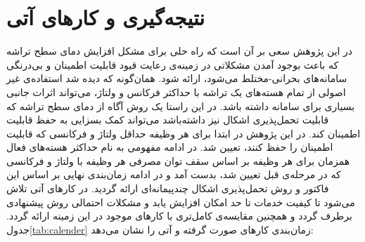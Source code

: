  \section{نتیجه‌گیری و کارهای آتی}
\label{sec:conclusion}
در این پژوهش سعی بر آن است که راه حلی برای مشکل افزایش دمای سطح تراشه که باعث بوجود آمدن مشکلاتی در زمینه‌ی رعایت قیود قابلیت اطمینان و بی‌درنگی سامانه‌های بحرانی-مختلط می‌شود، ارائه شود. همان‌گونه که دیده شد استفاده‌ی غیر اصولی از تمام هسته‌های یک تراشه با حداکثر فرکانس و ولتاژ، می‌تواند اثرات جانبی بسیاری برای سامانه داشته باشد. در این راستا یک روش آگاه از دمای سطح تراشه که قابلیت تحمل‌پذیری اشکال نیز داشته‌باشد می‌تواند کمک بسزایی به حفظ قابلیت اطمینان کند. در این پژوهش در ابتدا برای هر وظیفه حداقل ولتاژ و فرکانسی که قابلیت اطمینان را حفظ کنند، تعیین شد. در ادامه مفهومی به نام حداکثر هسته‌های فعال همزمان برای هر وظیفه بر اساس سقف توان مصرفی هر وظیفه با ولتاژ و فرکانسی که در مرحله‌ی قبل تعیین شد، بدست آمد و در ادامه زمان‌بندی نهایی بر اساس این فاکتور و روش تحمل‌پذیری اشکال چندپیمانه‌ای ارائه گردید. در کارهای آتی تلاش می‌شود تا کیفیت خدمات تا حد امکان افزایش یابد و مشکلات احتمالی روش پیشنهادی برطرف گردد و همچنین مقایسه‌ی کامل‌تری با کارهای موجود در این زمینه ارائه گردد. جدول\ref{tab:calender} زمان‌بندی کارهای صورت گرفته و آتی را نشان می‌دهد:


